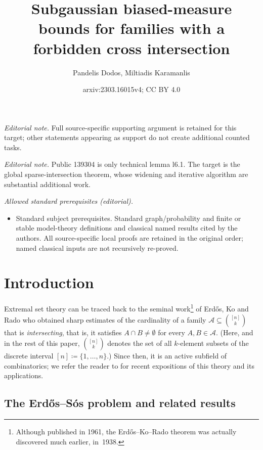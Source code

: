 \documentclass[10pt,a4paper]{amsart}
\title{Subgaussian biased-measure bounds for families with a forbidden cross intersection}
\author{Pandelis Dodos, Miltiadis Karamanlis}
\date{arxiv:2303.16015v4; CC BY 4.0}
\theoremstyle{remark}
\begin{document}
\maketitle
\noindent\textit{Editorial note.} Full source-specific supporting argument is retained for this target; other statements appearing as support do not create additional counted tasks.\par\medskip
\noindent\textit{Editorial note.} Public 139304 is only technical lemma l6.1. The target is the global sparse-intersection theorem, whose widening and iterative algorithm are substantial additional work.\par\medskip
\noindent\textit{Allowed standard prerequisites (editorial).}\begin{itemize}
\item Standard subject prerequisites. Standard graph/probability and finite or stable model-theory definitions and classical named results cited by the authors. All source-specific local proofs are retained in the original order; named classical inputs are not recursively re-proved.
\end{itemize}\medskip
\section{Introduction} \label{sec1}


Extremal set theory can be traced back to the seminal work\footnote{Although published in 1961,
the Erd\H{o}s--Ko--Rado theorem was actually discovered much earlier, in~1938.} of Erd\H{o}s, Ko and
Rado \cite{EKR61} who obtained sharp estimates of the cardinality of a family $\mathcal{A}\subseteq \binom{[n]}{k}$
that is \textit{intersecting}, that is, it satisfies $A\cap B\neq \emptyset$ for every $A,B\in\mathcal{A}$.
(Here, and in the rest of this paper, $\binom{[n]}{k}$ denotes the set of all $k$-element subsets of
the discrete interval $[n]\coloneqq \{1,\dots,n\}$.) Since then, it is an active subfield of combinatorics;
we refer the reader to \cite{El22,FT18} for recent expositions of this theory and its applications.

\subsection{The Erd\H{o}s--S\'{o}s problem and related results} \label{subsec1.1}
\end{document}
